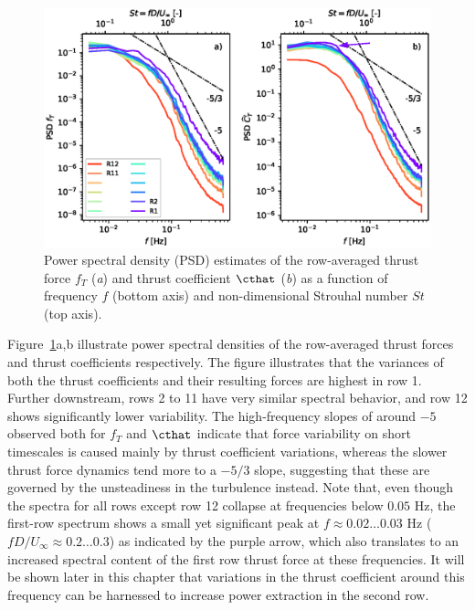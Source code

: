 	\begin{figure}
		\includegraphics[width=\textwidth]{chapters/analysis_induction_control/spectra_thrust_cthat.eps}
		\caption[Power spectral density (PSD) estimates of the row-averaged thrust force $f_T$ and thrust coefficient $\cthat$ as a function of frequency $f$ and non-dimensional Strouhal number $St$.]{Power spectral density (PSD) estimates of the row-averaged thrust force $f_T$ (\emph{a}) and thrust coefficient $\cthat$ (\emph{b}) as a function of frequency $f$ (bottom axis) and non-dimensional Strouhal number $St$ (top axis). \label{fig:spectra_thrust_cthat}}
	\end{figure}
	
	Figure~\ref{fig:spectra_thrust_cthat}a,b illustrate power spectral densities of the row-averaged thrust forces and thrust coefficients respectively. The figure illustrates that the variances of both the thrust coefficients and their resulting forces are highest in row 1. Further downstream, rows 2 to 11 have very similar spectral behavior, and row 12 shows significantly lower variability. The high-frequency slopes of around $-5$ observed both for $f_T$ and $\cthat$ indicate that force variability on short timescales is caused mainly by thrust coefficient variations, whereas the slower thrust force dynamics tend more to a $-5/3$ slope, suggesting that these are governed by the unsteadiness in the turbulence instead. Note that, even though the spectra for all rows except row 12 collapse at frequencies below $0.05$ Hz, the first-row spectrum shows a small yet significant peak at $f \approx 0.02 \dots 0.03$ Hz ($f D / U_\infty \approx 0.2 \dots 0.3$) as indicated by the purple arrow, which also translates to an increased spectral content of the first row thrust force at these frequencies. It will be shown later in this chapter that variations in the thrust coefficient around this frequency can be harnessed to increase power extraction in the second row. 

